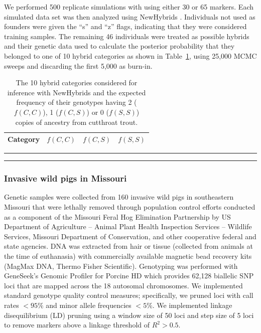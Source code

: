 {We performed 500 replicate simulations with \gscramble{} using either 30 or 65 markers.  Each
simulated data set was then analyzed using {\sc NewHybrids} \citep{anderson2002model}. Individuals not used as founders were given the ``s'' and ``z'' flags, indicating that they were considered training samples.  The remaining 46 individuals were treated as possible hybrids and their genetic data used to calculate the posterior probability that they belonged to one of 10 hybrid categories as shown in Table~\ref{tab:newhybcats}, using 25,000 MCMC sweeps and discarding the first 5,000 as burn-in.
\begin{table}
\caption{The 10 hybrid categories considered for inference with {\sc NewHybrids} and the
expected frequency of their genotypes having 2 ($f(C,C)$), 1 ($f(C,S)$) or 0 ($f(S,S)$) copies of ancestry from cutthroat trout.}
\label{tab:newhybcats}
{\small
\begin{tabular*}{\columnwidth}{@{\extracolsep{\fill}} lrrr}
\hline\hline
Category	& $f(C,C)$ &	$f(C,S)$ & 	$f(S,S)$ \\ \hline

\end{tabular*}
}
\vspace*{-2.3ex}\hrule\vspace*{0.3ex}\hrule
\end{table}



\subsubsection*{Invasive wild pigs in Missouri}

Genetic samples were collected from 160 invasive wild pigs in southeastern
Missouri that were lethally removed through population control efforts
conducted as a component of the Missouri Feral Hog Elimination Partnership
by US Department of Agriculture – Animal Plant Health Inspection Services –
Wildlife Services, Missouri Department of Conservation, and other cooperative
federal and state agencies.
DNA was extracted from hair or tissue (collected from animals at the time of euthanasia) with
commercially available magnetic bead recovery kits (MagMax DNA, Thermo Fisher Scientific).
Genotyping was performed with GeneSeek’s Genomic Profiler for Porcine HD which provides
62,128 biallelic SNP loci that are mapped across the 18 autosomal chromosomes.
We implemented standard genotype quality control measures; specifically, we pruned loci with
call rates $<95\%$ and minor allele frequencies $<5\%$.
We implemented linkage disequilibrium (LD) pruning using a window size of 50 loci and step size
of 5 loci to remove markers above a linkage threshold of $R^2 > 0.5$.

}
